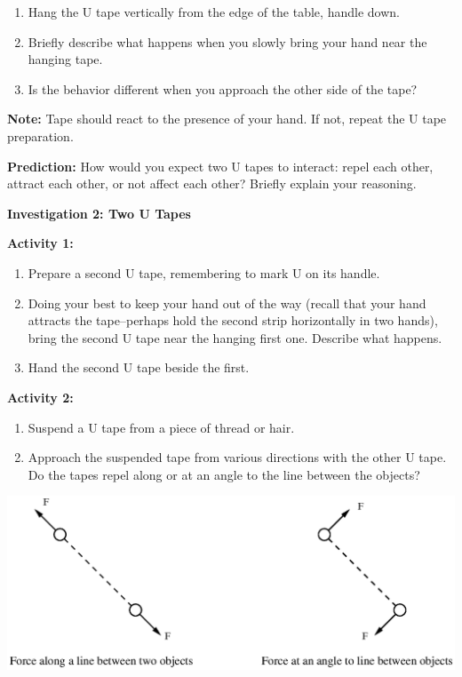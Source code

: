 \begin{enumerate}
\item Hang the U tape vertically from the edge of the table, handle down.
\item Briefly describe what happens when you slowly bring your hand near
the hanging tape.\vspace{15mm}

\item Is the behavior different when you approach the other side of the
tape?\vspace{15mm}

\end{enumerate}
\textbf{Note:} Tape should react to the presence of your hand. If
not, repeat the U tape preparation.

\textbf{Prediction:} How would you expect two U tapes to interact:
repel each other, attract each other, or not affect each other? Briefly
explain your reasoning.
\vspace{1in}

\textbf{Investigation 2: Two U Tapes}

\textbf{Activity 1:}

\begin{enumerate}
\item Prepare a second U tape, remembering to mark U on its handle.
\item Doing your best to keep your hand out of the way (recall that your
hand attracts the tape--perhaps hold the second strip horizontally
in two hands), bring the second U tape near the hanging first one.
Describe what happens.\vspace{15mm}

\item Hand the second U tape beside the first.
\end{enumerate}
\textbf{Activity 2:}

\begin{enumerate}
\item Suspend a U tape from a piece of thread or hair.
\item Approach the suspended tape from various directions with the other
U tape. Do the tapes repel along or at an angle to the line between
the objects?
\end{enumerate}
\vspace{0.3cm}
{\centering \includegraphics{int_elec_charges_fig_1.eps} \par}
\vspace{0.3cm}

